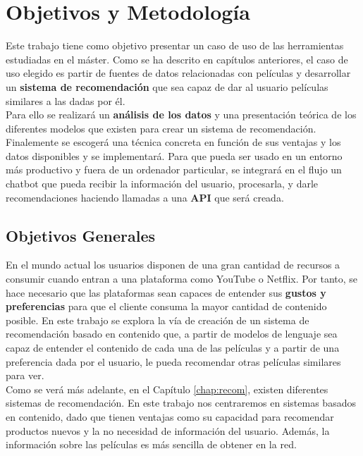 \chapter{Objetivos y Metodología}\label{chap:objetivos}

Este trabajo tiene como objetivo presentar un caso de uso de las herramientas estudiadas en el máster. Como se ha descrito en capítulos anteriores, el caso de uso elegido es partir de fuentes de datos relacionadas con películas y desarrollar un \textbf{sistema de recomendación} que sea capaz de dar al usuario películas similares a las dadas por él.\\

Para ello se realizará un \textbf{análisis de los datos} y una presentación teórica de los diferentes modelos que existen para crear un sistema de recomendación. Finalemente se escogerá una técnica concreta en función de sus ventajas y los datos disponibles y se implementará. Para que pueda ser usado en un entorno más productivo y fuera de un ordenador particular, se integrará en el flujo un chatbot que pueda recibir la información del usuario, procesarla, y darle recomendaciones haciendo llamadas a una \textbf{API} que será creada.



\section{Objetivos Generales}\label{sec:objgenerales}

En el mundo actual los usuarios disponen de una gran cantidad de recursos a consumir cuando entran a una plataforma como YouTube o Netflix. Por tanto, se hace necesario que las plataformas sean capaces de entender sus \textbf{gustos y preferencias} para que el cliente consuma la mayor cantidad de contenido posible. En este trabajo se explora la vía de creación de un sistema de recomendación basado en contenido que, a partir de modelos de lenguaje sea capaz de entender el contenido de cada una de las películas y a partir de una preferencia dada por el usuario, le pueda recomendar otras películas similares para ver.\\

Como se verá más adelante, en el Capítulo \ref{chap:recom}, existen diferentes sistemas de recomendación. En este trabajo nos centraremos en sistemas basados en contenido, dado que tienen ventajas como su capacidad para recomendar productos nuevos y la no necesidad de información del usuario. Además, la información sobre las películas es más sencilla de obtener en la red.\\

